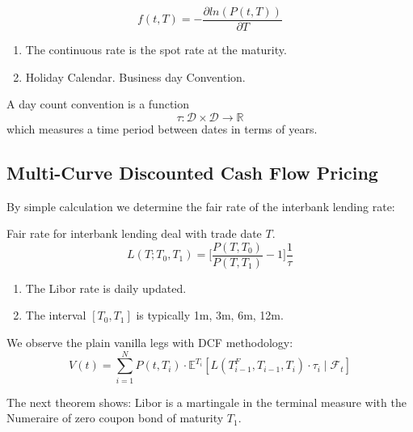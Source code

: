 \begin{definition}
\begin{equation*}
	f(t, T) = -\frac{\partial ln(P(t, T))}{\partial T}
\end{equation*}
\end{definition}
\begin{remark}
\quad
\begin{enumerate}
	\item The continuous rate is the spot rate at the maturity. 
	\item Holiday Calendar. Business day Convention.
\end{enumerate}
\end{remark}

\begin{definition}
A day count convention is a function 
\[
\tau : \mathcal{D} \times \mathcal{D} \to \mathbb{R}
\]
which measures a time period between dates in terms of years.
\end{definition}


\subsection{Multi-Curve Discounted Cash Flow Pricing}
By simple calculation we determine the fair rate of the interbank lending rate:
\begin{definition}
Fair rate for interbank lending deal with trade date $T$.
\begin{equation*}
	L(T;T_0, T_1) = \bigg[\frac{P(T, T_0)}{P(T, T_1)} - 1\bigg] \frac{1}{\tau}
\end{equation*}
\end{definition}
\begin{remark}
\quad
\begin{enumerate}
	\item The Libor rate is daily updated.
	\item The interval $[T_0, T_1]$ is typically 1m, 3m, 6m, 12m. 
\end{enumerate}	
\end{remark}

We observe the plain vanilla legs with DCF methodology: 
\[
V(t) = \sum_{i=1}^{N} P(t, T_i) \cdot \mathbb{E}^{T_i} \left[ L(T_{i-1}^F, T_{i-1}, T_i) \cdot \tau_i \mid \mathcal{F}_t \right]
\]



The next theorem shows: Libor is a martingale in the terminal measure with the Numeraire of zero coupon bond of maturity $T_1$.

